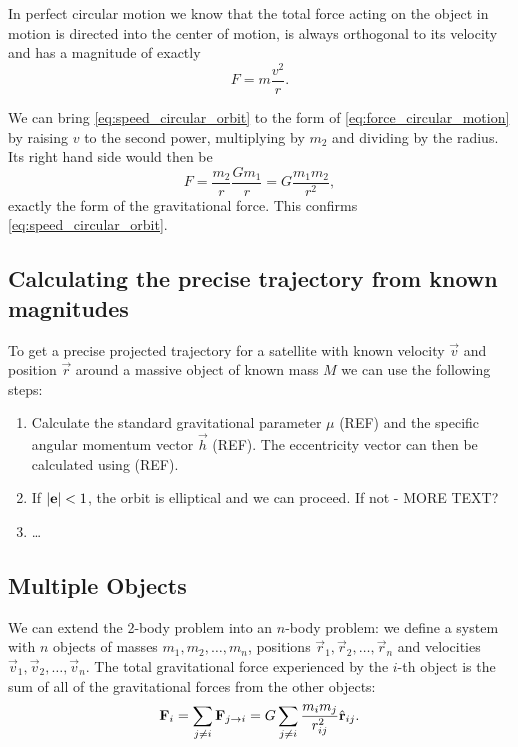 In perfect circular motion we know that the total force acting on the object in motion is directed into the center of motion, is always orthogonal to its velocity and has a magnitude of exactly
\begin{equation}
	F = m\frac{v^{2}}{r}.
	\label{eq:force_circular_motion}
\end{equation}

We can bring \autoref{eq:speed_circular_orbit} to the form of \autoref{eq:force_circular_motion} by raising $v$ to the second power, multiplying by $m_{2}$ and dividing by the radius. Its right hand side would then be
\[
	F = \frac{m_{2}}{r}\frac{Gm_{1}}{r} = G\frac{m_{1}m_{2}}{r^{2}},
\]
exactly the form of the gravitational force. This confirms \autoref{eq:speed_circular_orbit}.

\subsection{Calculating the precise trajectory from known magnitudes}
To get a precise projected trajectory for a satellite with known velocity $\vec{v}$ and position $\vec{r}$ around a massive object of known mass $M$ we can use the following steps:
\begin{enumerate}
	\item Calculate the standard gravitational parameter $\mu$ (REF) and the specific angular momentum vector $\vec{h}$ (REF). The eccentricity vector can then be calculated using (REF).
	\item If $\left| \mathbf{e} \right|<1$, the orbit is elliptical and we can proceed. If not - MORE TEXT?
	\item \ldots
\end{enumerate}

\subsection{Multiple Objects}
We can extend the 2-body problem into an $n$-body problem: we define a system with $n$ objects of masses $m_{1},m_{2},\dots,m_{n}$, positions $\vec{r}_{1},\vec{r}_{2},\dots,\vec{r}_{n}$ and velocities $\vec{v}_{1},\vec{v}_{2},\dots,\vec{v}_{n}$. The total gravitational force experienced by the $i$-th object is the sum of all of the gravitational forces from the other objects:
\begin{equation}
	\mathbf{F}_{i} = \sum\limits_{j\neq i}\mathbf{F}_{j\to i} = G\sum\limits_{j\neq i}\frac{m_{i}m_{j}}{r_{ij}^{2}}\hat{\mathbf{r}}_{ij}.
	\label{eq:n_body_single_force}
\end{equation}

